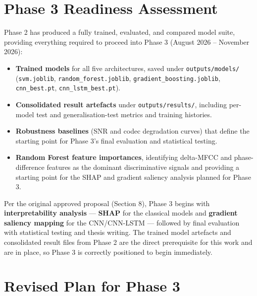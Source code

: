 \documentclass[12pt,a4paper]{report}
\begin{document}
\chapter{Phase 3 Readiness Assessment}

Phase 2 has produced a fully trained, evaluated, and compared model suite, providing
everything required to proceed into Phase 3 (August 2026 -- November 2026):

\begin{itemize}
  \item \textbf{Trained models} for all five architectures, saved under
    \texttt{outputs/models/} (\texttt{svm.joblib}, \texttt{random\_forest.joblib},
    \texttt{gradient\_boosting.joblib}, \texttt{cnn\_best.pt}, \texttt{cnn\_lstm\_best.pt}).
  \item \textbf{Consolidated result artefacts} under \texttt{outputs/results/}, including
    per-model test and generalisation-test metrics and training histories.
  \item \textbf{Robustness baselines} (SNR and codec degradation curves) that define the
    starting point for Phase 3's final evaluation and statistical testing.
  \item \textbf{Random Forest feature importances}, identifying delta-MFCC and
    phase-difference features as the dominant discriminative signals and providing a
    starting point for the SHAP and gradient saliency analysis planned for Phase 3.
\end{itemize}

Per the original approved proposal (Section 8), Phase 3 begins with \textbf{interpretability
analysis} --- \textbf{SHAP} for the classical models and \textbf{gradient saliency mapping}
for the CNN/CNN-LSTM --- followed by final evaluation with statistical testing and thesis
writing. The trained model artefacts and consolidated result files from Phase 2 are the
direct prerequisite for this work and are in place, so Phase 3 is correctly positioned to
begin immediately.

\chapter{Revised Plan for Phase 3}
\end{document}
